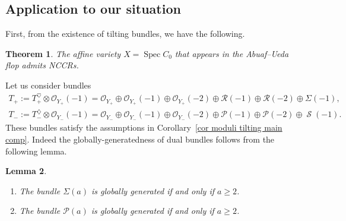 \documentclass[pdftex]{sigma}
\DeclareMathOperator{\Spi}{\mathcal{S}}
\DeclareMathOperator{\Spec}{Spec}
\newcommand{\stsh}{\mathcal{O}}
\numberwithin{equation}{section}
\newtheorem{Theorem}{Theorem}[section]
\newtheorem{Lemma}[Theorem]{Lemma}
\begin{document}
\subsection{Application to our situation}

First, from the existence of tilting bundles, we have the following.

\begin{Theorem}
The affine variety $X = \Spec C_0$ that appears in the Abuaf--Ueda flop admits NCCRs.
\end{Theorem}

Let us consider bundles
\begin{gather*}
T_+ := T_+^{\heartsuit} \otimes \stsh_{Y_+}(-1) = \stsh_{Y_+} \oplus \stsh_{Y_+}(-1) \oplus \stsh_{Y_+}(-2) \oplus \mathcal{R}(-1) \oplus \mathcal{R}(-2) \oplus \Sigma(-1), \\
T_- := T_-^{\diamondsuit} \otimes \stsh_{Y_-}(-1) = \stsh_{Y_-} \oplus \stsh_{Y_-}(-1) \oplus \stsh_{Y_-}(-2) \oplus \mathcal{P}(-1) \oplus \mathcal{P}(-2) \oplus \Spi(-1).
\end{gather*}
These bundles satisfy the assumptions in Corollary~\ref{cor moduli tilting main comp}.
Indeed the globally-generatedness of dual bundles follows from the following lemma.

\begin{Lemma}\quad
\begin{enumerate}\itemsep=0pt
\item[$1.$] The bundle $\Sigma(a)$ is globally generated if and only if $a \geq 2$.
\item[$2.$] The bundle $\mathcal{P}(a)$ is globally generated if and only if $a \geq 2$.
\end{enumerate}
\end{Lemma}
\end{document}
